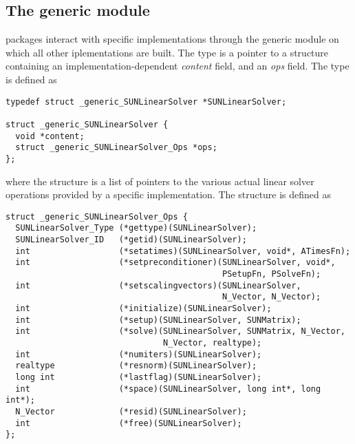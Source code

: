\bigskip


\subsection{The generic  module}\label{ss:sunlinsol_Generic}

{\sundials} packages interact with specific {\sunlinsol} implementations
through the generic {\sunlinsol} module on which all other {\sunlinsol}
iplementations are built.  The  type is a pointer
to a structure containing an implementation-dependent \emph{content} field,
and an \emph{ops} field.  The type  is defined as
\begin{verbatim}
typedef struct _generic_SUNLinearSolver *SUNLinearSolver;

struct _generic_SUNLinearSolver {
  void *content;
  struct _generic_SUNLinearSolver_Ops *ops;
};
\end{verbatim}
where the  structure is a list of
pointers to the various actual linear solver operations provided by a
specific implementation.  The 
structure is defined as
\begin{verbatim}
struct _generic_SUNLinearSolver_Ops {
  SUNLinearSolver_Type (*gettype)(SUNLinearSolver);
  SUNLinearSolver_ID   (*getid)(SUNLinearSolver);
  int                  (*setatimes)(SUNLinearSolver, void*, ATimesFn);
  int                  (*setpreconditioner)(SUNLinearSolver, void*,
                                            PSetupFn, PSolveFn);
  int                  (*setscalingvectors)(SUNLinearSolver,
                                            N_Vector, N_Vector);
  int                  (*initialize)(SUNLinearSolver);
  int                  (*setup)(SUNLinearSolver, SUNMatrix);
  int                  (*solve)(SUNLinearSolver, SUNMatrix, N_Vector,
                                N_Vector, realtype);
  int                  (*numiters)(SUNLinearSolver);
  realtype             (*resnorm)(SUNLinearSolver);
  long int             (*lastflag)(SUNLinearSolver);
  int                  (*space)(SUNLinearSolver, long int*, long int*);
  N_Vector             (*resid)(SUNLinearSolver);
  int                  (*free)(SUNLinearSolver);
};
\end{verbatim}

